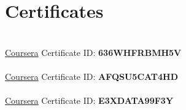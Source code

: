 \documentclass[]{deedy-resume-openfont}
\begin{document}
\sectionsep

\section{Certificates}
\\
\href{https://www.coursera.org/account/accomplishments/verify/636WHFRBMH5V}{\faCertificate\; Coursera} \textbullet{} Certificate ID: \textbf{636WHFRBMH5V}
\vspace{\topsep}\\
\\
\href{https://www.coursera.org/account/accomplishments/verify/AFQSU5CAT4HD}{\faCertificate\; Coursera} \textbullet{} Certificate ID: \textbf{AFQSU5CAT4HD}
\vspace{\topsep}\\
\\
\href{https://www.coursera.org/account/accomplishments/verify/E3XDATA99F3Y}{\faCertificate\; Coursera} \textbullet{} Certificate ID: \textbf{E3XDATA99F3Y}


\end{document}
